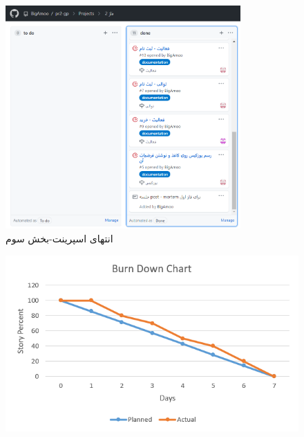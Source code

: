 \documentclass[12pt,a4paper]{article}
\begin{document}
		\begin{figure}[h!]
			\begin{center}
				\includegraphics[width=9cm]{images/screenshot_6.png}
			\end{center}
			\caption{انتهای اسپرینت-بخش سوم}
		\end{figure}
	
	\pagebreak
	
	
	\begin{figure}[h!]
		\begin{center}
			\includegraphics[width=14cm]{images/Burn Down Chart.png}
			
		\end{center}
		\caption{}
	\end{figure}
	
	
	
\end{document}
